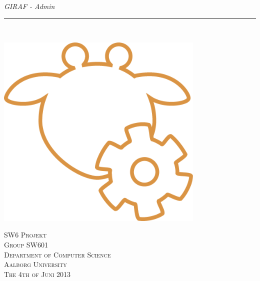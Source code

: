
\thispagestyle{empty}
\begin{flushright}
\vspace{3cm}

\phantom{hul}

\phantom{hul}

\phantom{hul}

\textsl{\Huge GIRAF - Admin} \\ \vspace{1cm}

\rule{13cm}{3mm} \\ \vspace{1.5cm}
\vspace{1cm}

\includegraphics[width=0.75\textwidth]{images/girafAdminLogo.png}

\vspace{1.5cm} 
\textsc{\Large SW6 Projekt \\
Group SW601 \\
Department of Computer Science\\
Aalborg University\\
The 4th of Juni 2013\\}
\end{flushright}
